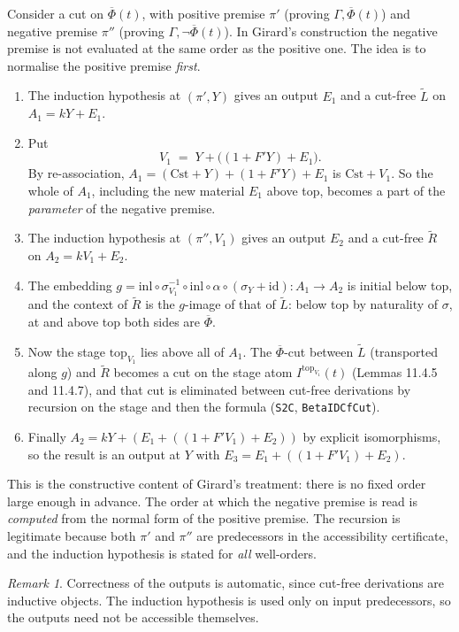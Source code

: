 \documentclass[11pt]{article}
\theoremstyle{remark}
\newtheorem{remark}[theorem]{Remark}
\newcommand{\id}{\mathrm{id}}
\newcommand{\Phib}{\overline{\Phi}}
\newcommand{\Cst}{\mathrm{Cst}}
\renewcommand{\tt}[1]{\texttt{#1}}
\begin{document}
Consider a cut on $\Phib(t)$, with positive premise $\pi'$ (proving
$\Gamma,\Phib(t)$) and negative premise $\pi''$ (proving
$\Gamma,\neg\Phib(t)$). In Girard's construction the negative premise is
not evaluated at the same order as the positive one. The idea is to
normalise the positive premise \emph{first}.
\begin{enumerate}
\item The induction hypothesis at $(\pi',Y)$ gives an output $E_1$ and a
cut-free $\widetilde L$ on $A_1=kY+E_1$.
\item Put
\[
 V_1 \;=\; Y+\bigl((1+F'Y)+E_1\bigr).
\]
By re-association, $A_1=(\Cst+Y)+(1+F'Y)+E_1$ is $\Cst+V_1$. So the whole
of $A_1$, including the new material $E_1$ above top, becomes a part of
the \emph{parameter} of the negative premise.
\item The induction hypothesis at $(\pi'',V_1)$ gives an output $E_2$ and
a cut-free $\widetilde R$ on $A_2=kV_1+E_2$.
\item The embedding $g=\mathrm{inl}\circ\sigma_{V_1}^{-1}\circ
\mathrm{inl}\circ\alpha\circ(\sigma_Y+\id):A_1\to A_2$ is initial below
top, and the context of $\widetilde R$ is the $g$-image of that of
$\widetilde L$: below top by naturality of $\sigma$, at and above top both
sides are $\Phib$.
\item Now the stage $\mathrm{top}_{V_1}$ lies above all of $A_1$. The $\Phib$-cut
between $\widetilde L$ (transported along $g$) and $\widetilde R$ becomes
a cut on the stage atom $I^{\mathrm{top}_{V_1}}(t)$ (Lemmas 11.4.5 and 11.4.7),
and that cut is eliminated between cut-free derivations by recursion on
the stage and then the formula (\tt{S2C}, \texttt{BetaIDCfCut}).
\item Finally $A_2=kY+(E_1+((1+F'V_1)+E_2))$ by explicit isomorphisms, so
the result is an output at $Y$ with $E_3=E_1+((1+F'V_1)+E_2)$.
\end{enumerate}
This is the constructive content of Girard's treatment: there is no fixed
order large enough in advance. The order at which the negative premise is
read is \emph{computed} from the normal form of the positive premise. The
recursion is legitimate because both $\pi'$ and $\pi''$ are predecessors
in the accessibility certificate, and the induction hypothesis is stated
for \emph{all} well-orders.

\begin{remark}
Correctness of the outputs is automatic, since cut-free derivations are
inductive objects. The induction hypothesis is used only on input
predecessors, so the outputs need not be accessible themselves.
\end{remark}
\end{document}
